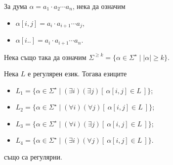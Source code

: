 За дума $\alpha = a_1 \cdot a_2 \cdots a_n$, нека да означим
\begin{itemize}
\item 
  $\alpha[i,j] = a_i \cdot a_{i+1} \cdots a_j$,
\item
  $\alpha[i..] = a_i \cdot a_{i+1} \cdots a_n$.
\end{itemize}

Нека също така да означим $\Sigma^{\geq k} = \{ \alpha \in \Sigma^\star \mid |\alpha| \geq k\}$.

\begin{problem}
  Нека $L$ е регулярен език.
  Тогава езиците
  \begin{itemize}
  \item
    $L_1 = \{ \alpha \in \Sigma^\star \mid (\exists i)(\exists j)[\ \alpha[i,j] \in L\ ]\}$;
  \item
    $L_2 = \{ \alpha \in \Sigma^\star \mid (\forall i)(\forall j)[\ \alpha[i,j] \in L\ ]\}$;
  \item 
    $L_3 = \{ \alpha \in \Sigma^\star \mid (\forall i)(\exists j)[\ \alpha[i,j] \in L\ ]\}$;
  \item
    $L_4 = \{ \alpha \in \Sigma^\star \mid (\exists i)(\forall j)[\ \alpha[i,j] \in L\ ]\}$.
  \end{itemize}
  също са регулярни.
\end{problem}
